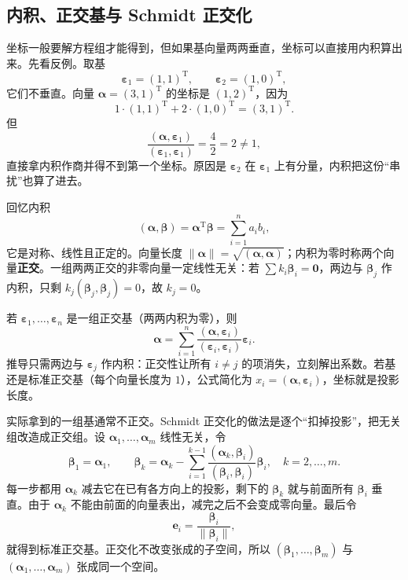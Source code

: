 \subsection{内积、正交基与 Schmidt 正交化}

坐标一般要解方程组才能得到，但如果基向量两两垂直，坐标可以直接用内积算出来。先看反例。取基
\[
\boldsymbol{\varepsilon}_1=(1,1)^{\mathrm T},\qquad \boldsymbol{\varepsilon}_2=(1,0)^{\mathrm T},
\]
它们不垂直。向量 $\boldsymbol{\alpha}=(3,1)^{\mathrm T}$ 的坐标是 $(1,2)^{\mathrm T}$，因为
\[
1\cdot(1,1)^{\mathrm T}+2\cdot(1,0)^{\mathrm T}=(3,1)^{\mathrm T}.
\]
但
\[
\frac{(\boldsymbol{\alpha},\boldsymbol{\varepsilon}_1)}{(\boldsymbol{\varepsilon}_1,\boldsymbol{\varepsilon}_1)}
=\frac{4}{2}=2\neq 1,
\]
直接拿内积作商并得不到第一个坐标。原因是 $\boldsymbol{\varepsilon}_2$ 在 $\boldsymbol{\varepsilon}_1$ 上有分量，内积把这份“串扰”也算了进去。

回忆内积
\[
(\boldsymbol{\alpha},\boldsymbol{\beta})=\boldsymbol{\alpha}^{\mathrm T}\boldsymbol{\beta}
=\sum_{i=1}^n a_i b_i,
\]
它是对称、线性且正定的。向量长度 $\lVert\boldsymbol{\alpha}\rVert=\sqrt{(\boldsymbol{\alpha},\boldsymbol{\alpha})}$；内积为零时称两个向量\textbf{正交}。一组两两正交的非零向量一定线性无关：若 $\sum k_i\boldsymbol{\beta}_i=\boldsymbol{0}$，两边与 $\boldsymbol{\beta}_j$ 作内积，只剩 $k_j(\boldsymbol{\beta}_j,\boldsymbol{\beta}_j)=0$，故 $k_j=0$。

若 $\boldsymbol{\varepsilon}_1,\ldots,\boldsymbol{\varepsilon}_n$ 是一组正交基（两两内积为零），则
\[
\boldsymbol{\alpha}=\sum_{i=1}^n
\frac{(\boldsymbol{\alpha},\boldsymbol{\varepsilon}_i)}{(\boldsymbol{\varepsilon}_i,\boldsymbol{\varepsilon}_i)}
\boldsymbol{\varepsilon}_i.
\]
推导只需两边与 $\boldsymbol{\varepsilon}_j$ 作内积：正交性让所有 $i\neq j$ 的项消失，立刻解出系数。若基还是标准正交基（每个向量长度为 $1$），公式简化为 $x_i=(\boldsymbol{\alpha},\boldsymbol{\varepsilon}_i)$，坐标就是投影长度。

实际拿到的一组基通常不正交。Schmidt 正交化的做法是逐个“扣掉投影”，把无关组改造成正交组。设 $\boldsymbol{\alpha}_1,\ldots,\boldsymbol{\alpha}_m$ 线性无关，令
\[
\boldsymbol{\beta}_1=\boldsymbol{\alpha}_1,\qquad
\boldsymbol{\beta}_k=\boldsymbol{\alpha}_k-\sum_{i=1}^{k-1}
\frac{(\boldsymbol{\alpha}_k,\boldsymbol{\beta}_i)}{(\boldsymbol{\beta}_i,\boldsymbol{\beta}_i)}
\boldsymbol{\beta}_i,\quad k=2,\ldots,m.
\]
每一步都用 $\boldsymbol{\alpha}_k$ 减去它在已有各方向上的投影，剩下的 $\boldsymbol{\beta}_k$ 就与前面所有 $\boldsymbol{\beta}_i$ 垂直。由于 $\boldsymbol{\alpha}_k$ 不能由前面的向量表出，减完之后不会变成零向量。最后令
\[
\boldsymbol{e}_i=\frac{\boldsymbol{\beta}_i}{\lVert\boldsymbol{\beta}_i\rVert},
\]
就得到标准正交基。正交化不改变张成的子空间，所以 $(\boldsymbol{\beta}_1,\ldots,\boldsymbol{\beta}_m)$ 与 $(\boldsymbol{\alpha}_1,\ldots,\boldsymbol{\alpha}_m)$ 张成同一个空间。


